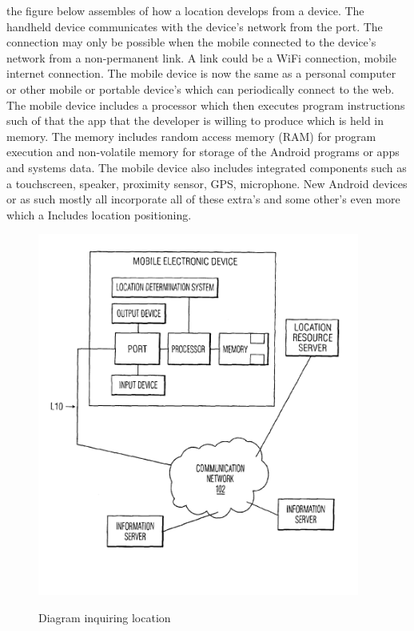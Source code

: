 \par the figure below assembles of how a location develops from a device. The handheld device communicates with the device's  network from the port.  The connection may only be possible when the mobile connected to the device's network from a non-permanent link.  A link could be a WiFi connection, mobile internet connection. The mobile device is now the same as a personal computer or other mobile or portable device's which can periodically connect to the web. The mobile device includes a processor which then executes program instructions such of that the app that the developer is willing to produce which is held in memory. The memory includes random access memory (RAM) for program execution and non-volatile memory for storage of the Android programs or apps and systems data. The mobile device also includes integrated components such as a touchscreen, speaker, proximity sensor, GPS, microphone. New Android devices or as such mostly all incorporate all of these extra's and some other's even more which a Includes location positioning. \cite{alizadeh2007location}

\begin{figure}[!ht]
    \center \includegraphics[width=300pt]{location}\\
    \caption{Diagram inquiring location \citep{rankin2005distributed}} \label{Figure: Diagram inquiring location}
\end{figure}


